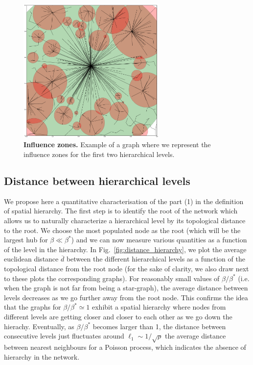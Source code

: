 \begin{figure} 
    \centering
    \includegraphics[width=0.65\textwidth]{gfx/chapter-networks/figure4.pdf} 
    \caption{{\bf Influence zones.} Example of a graph where we represent the influence zones for the
first two hierarchical levels.\label{fig:separation_example}} \end{figure}

\subsection{Distance between hierarchical levels}
 
We propose here a quantitative characterisation of the part (1) in the
definition of spatial hierarchy. The first step is to identify the root of the
network which allows us to naturally characterize a hierarchical level by its
topological distance to the root. We choose the most populated node as the root
(which will be the largest hub for $\beta\ll\beta^*$) and we can now measure
various quantities as a function of the level in the hierarchy. In
Fig.~\ref{fig:distance_hierarchy}, we plot the average euclidean distance
$\overline{d}$ between the different hierarchical levels as a function of the
topological distance from the root node (for the sake of clarity, we also draw
next to these plots the corresponding graphs). For reasonably small  values of
$\beta/\beta^*$ (i.e. when the graph is not far from being a star-graph), the
average distance between levels decreases as we go further away from the root
node. This confirms the idea that the graphs for $\beta/\beta^*\simeq 1$ exhibit
a spatial hierarchy where nodes from different levels are getting closer and
closer to each other as we go down the hierachy. Eventually, as $\beta/\beta^*$
becomes larger than 1, the distance between consecutive levels just fluctuates
around $\ell_1\sim 1/\sqrt{\rho}$ the average distance between nearest
neighbours for a Poisson process, which indicates the absence of hierarchy in
the network.



